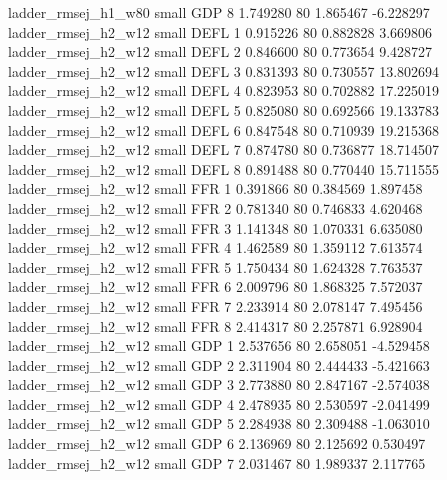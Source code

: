      ladder_rmsej_h1_w80      small      GDP                 8 1.749280 80       1.865467          -6.228297
     ladder_rmsej_h2_w12      small     DEFL                 1 0.915226 80       0.882828           3.669806
     ladder_rmsej_h2_w12      small     DEFL                 2 0.846600 80       0.773654           9.428727
     ladder_rmsej_h2_w12      small     DEFL                 3 0.831393 80       0.730557          13.802694
     ladder_rmsej_h2_w12      small     DEFL                 4 0.823953 80       0.702882          17.225019
     ladder_rmsej_h2_w12      small     DEFL                 5 0.825080 80       0.692566          19.133783
     ladder_rmsej_h2_w12      small     DEFL                 6 0.847548 80       0.710939          19.215368
     ladder_rmsej_h2_w12      small     DEFL                 7 0.874780 80       0.736877          18.714507
     ladder_rmsej_h2_w12      small     DEFL                 8 0.891488 80       0.770440          15.711555
     ladder_rmsej_h2_w12      small      FFR                 1 0.391866 80       0.384569           1.897458
     ladder_rmsej_h2_w12      small      FFR                 2 0.781340 80       0.746833           4.620468
     ladder_rmsej_h2_w12      small      FFR                 3 1.141348 80       1.070331           6.635080
     ladder_rmsej_h2_w12      small      FFR                 4 1.462589 80       1.359112           7.613574
     ladder_rmsej_h2_w12      small      FFR                 5 1.750434 80       1.624328           7.763537
     ladder_rmsej_h2_w12      small      FFR                 6 2.009796 80       1.868325           7.572037
     ladder_rmsej_h2_w12      small      FFR                 7 2.233914 80       2.078147           7.495456
     ladder_rmsej_h2_w12      small      FFR                 8 2.414317 80       2.257871           6.928904
     ladder_rmsej_h2_w12      small      GDP                 1 2.537656 80       2.658051          -4.529458
     ladder_rmsej_h2_w12      small      GDP                 2 2.311904 80       2.444433          -5.421663
     ladder_rmsej_h2_w12      small      GDP                 3 2.773880 80       2.847167          -2.574038
     ladder_rmsej_h2_w12      small      GDP                 4 2.478935 80       2.530597          -2.041499
     ladder_rmsej_h2_w12      small      GDP                 5 2.284938 80       2.309488          -1.063010
     ladder_rmsej_h2_w12      small      GDP                 6 2.136969 80       2.125692           0.530497
     ladder_rmsej_h2_w12      small      GDP                 7 2.031467 80       1.989337           2.117765

